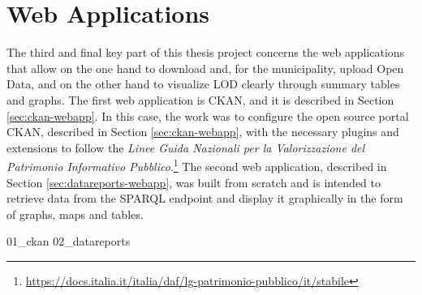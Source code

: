 \chapter{Web Applications}
\label{chp:webapps}

The third and final key part of this thesis project concerns the web applications that allow on the one hand to download and, for the municipality, upload Open Data, and on the other hand to visualize \acl{LOD} clearly through summary tables and graphs. The first web application is CKAN, and it is described in Section \ref{sec:ckan-webapp}. In this case, the work was to configure the open source portal CKAN, described in Section \ref{sec:ckan-webapp}, with the necessary plugins and extensions to follow the \textit{Linee Guida Nazionali per la Valorizzazione del Patrimonio Informativo Pubblico}.\footnote{\url{https://docs.italia.it/italia/daf/lg-patrimonio-pubblico/it/stabile}} The second web application, described in Section \ref{sec:datareports-webapp}, was built from scratch and is intended to retrieve data from the \ac{SPARQL} endpoint and display it graphically in the form of graphs, maps and tables.

{01_ckan}%
{02_datareports}%